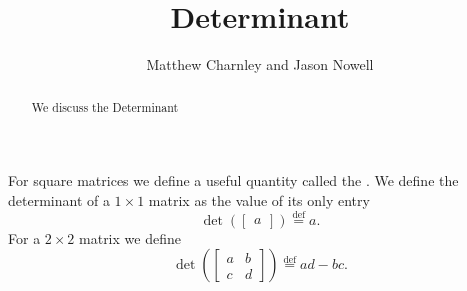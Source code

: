 \documentclass{ximera}
\title{Determinant}
\author{Matthew Charnley and Jason Nowell}
\begin{document}
\begin{abstract}
    We discuss the Determinant
\end{abstract}
\maketitle


\label{det:section}


For square matrices we define a useful quantity called the \emph{}.  We define the determinant of a $1 \times 1$ matrix as the value of its only entry
\begin{equation*}
    \det \left(
        \begin{bmatrix}
            a 
        \end{bmatrix}
    \right)
    \overset{\text{def}}{=} a .
\end{equation*}
For a $2 \times 2$ matrix we define
\begin{equation*}
    \det \left(
        \begin{bmatrix}
            a & b \\
            c & d
        \end{bmatrix}
    \right)
    \overset{\text{def}}{=}
    ad-bc .
\end{equation*}
\end{document}
